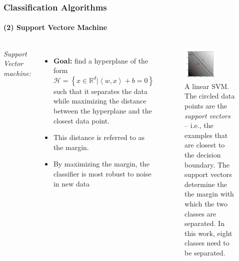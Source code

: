 \documentclass[10pt,usepdftitle=false,aspectratio=169]{beamer}
\begin{document}
\begin{frame}\frametitle{Classification Algorithms}
    \framesubtitle{(2) Support Vectore Machine}

	\begin{columns}
		\vspace{1em}
	
		\emph{Support Vector machine:}
		\begin{itemize}
			\item \textbf{Goal:}  find a hyperplane of the form $\mathcal{H} = \left\lbrace x \in \mathbb{R}^d | \left\langle w,x\right\rangle + b =0 \right\rbrace $ such that it separates the data while maximizing the distance between the hyperplane and the closest data point. 
			\item This distance is referred to as the margin. 
			\item By maximizing the margin, the classifier is most robust to noise in new data
		\end{itemize}
		\vspace{1em}



\begin{figure}
	\centering
	\includegraphics[width=0.6\textwidth]{figures/svm.png}
	\caption{A linear SVM. The circled data points are the \textit{support vectors} -- i.e., the examples that are closest to the decision boundary. The support vectors determine the the margin with which the two classes are separated. In this work, eight classes need to be separated.}

\end{figure}
		
		\end{columns}
	\end{frame}
\end{document}
